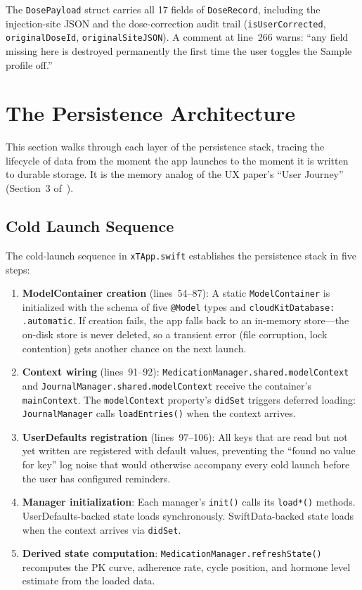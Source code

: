 \documentclass[11pt,a4paper]{article}
\newcommand{\code}[1]{\texttt{\small #1}}
\begin{document}
The \code{DosePayload} struct carries all 17 fields of \code{DoseRecord},
including the injection-site JSON and the dose-correction audit trail
(\code{isUserCorrected}, \code{originalDoseId},
\code{originalSiteJSON}). A comment at line~266 warns: ``any field
missing here is destroyed permanently the first time the user toggles the
Sample profile off.''

\section{The Persistence Architecture}
\label{sec:architecture}

This section walks through each layer of the persistence stack, tracing the
lifecycle of data from the moment the app launches to the moment it is
written to durable storage. It is the memory analog of the UX paper's ``User
Journey'' (Section~3 of~\cite{xtux}).

\subsection{Cold Launch Sequence}
\label{sec:cold_launch}

The cold-launch sequence in \code{xTApp.swift} establishes the persistence
stack in five steps:

\begin{enumerate}[nosep,leftmargin=1.4em]
\item \textbf{ModelContainer creation} (lines~54--87): A static
  \code{ModelContainer} is initialized with the schema of five
  \code{@Model} types and \code{cloudKitDatabase: .automatic}. If creation
  fails, the app falls back to an in-memory store---the on-disk store is
  never deleted, so a transient error (file corruption, lock contention) gets
  another chance on the next launch.
\item \textbf{Context wiring} (lines~91--92):
  \code{MedicationManager.shared.modelContext} and
  \code{JournalManager.shared.modelContext} receive the container's
  \code{mainContext}. The \code{modelContext} property's \code{didSet}
  triggers deferred loading: \code{JournalManager} calls
  \code{loadEntries()} when the context arrives.
\item \textbf{UserDefaults registration} (lines~97--106): All keys that are
  read but not yet written are registered with default values, preventing
  the ``found no value for key'' log noise that would otherwise accompany
  every cold launch before the user has configured reminders.
\item \textbf{Manager initialization}: Each manager's \code{init()} calls its
  \code{load*()} methods. UserDefaults-backed state loads synchronously.
  SwiftData-backed state loads when the context arrives via \code{didSet}.
\item \textbf{Derived state computation}: \code{MedicationManager.refreshState()}
  recomputes the PK curve, adherence rate, cycle position, and hormone level
  estimate from the loaded data.
\end{enumerate}
\end{document}

